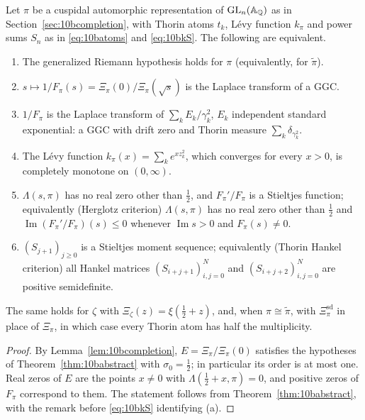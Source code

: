 \begin{theorem}\label{thm:10bmain}
Let $\pi$ be a cuspidal automorphic representation of $\mathrm{GL}_n(\mathbb{A}_{\mathbb{Q}})$ as in Section~\ref{sec:10bcompletion}, with Thorin atoms $t_k$, L\'evy function $k_\pi$ and power sums $S_n$ as in \eqref{eq:10batoms} and \eqref{eq:10bkS}. The following are equivalent.
\begin{enumerate}
\item[(a)] The generalized Riemann hypothesis holds for $\pi$ (equivalently, for $\tilde\pi$).
\item[(b)] $s\mapsto1/F_\pi(s) = \Xi_\pi(0)/\Xi_\pi(\sqrt s)$ is the Laplace transform of a GGC.
\item[(c)] $1/F_\pi$ is the Laplace transform of $\sum_kE_k/\gamma_k^2$, $E_k$ independent standard exponential: a GGC with drift zero and Thorin measure $\sum_k\delta_{\gamma_k^2}$.
\item[(d)] The L\'evy function $k_\pi(x) = \sum_ke^{xz_k^2}$, which converges for every $x>0$, is completely monotone on $(0,\infty)$.
\item[(e)] $\Lambda(s,\pi)$ has no real zero other than $\frac12$, and $F_\pi'/F_\pi$ is a Stieltjes function; equivalently (Herglotz criterion) $\Lambda(s,\pi)$ has no real zero other than $\frac12$ and $\operatorname{Im}(F_\pi'/F_\pi)(s)\le0$ whenever $\operatorname{Im}s>0$ and $F_\pi(s)\ne0$.
\item[(f)] $(S_{j+1})_{j\ge0}$ is a Stieltjes moment sequence; equivalently (Thorin Hankel criterion) all Hankel matrices $(S_{i+j+1})_{i,j=0}^N$ and $(S_{i+j+2})_{i,j=0}^N$ are positive semidefinite.
\end{enumerate}
The same holds for $\zeta$ with $\Xi_\zeta(z) = \xi(\frac12+z)$, and, when $\pi\cong\tilde\pi$, with $\Xi^{\mathrm{sd}}_\pi$ in place of $\Xi_\pi$, in which case every Thorin atom has half the multiplicity.
\end{theorem}

\begin{proof}
By Lemma~\ref{lem:10bcompletion}, $E = \Xi_\pi/\Xi_\pi(0)$ satisfies the hypotheses of Theorem~\ref{thm:10babstract} with $\sigma_0 = \frac12$; in particular its order is at most one. Real zeros of $E$ are the points $x\ne0$ with $\Lambda(\frac12+x,\pi)=0$, and positive zeros of $F_\pi$ correspond to them. The statement follows from Theorem~\ref{thm:10babstract}, with the remark before \eqref{eq:10bkS} identifying (a).
\end{proof}

